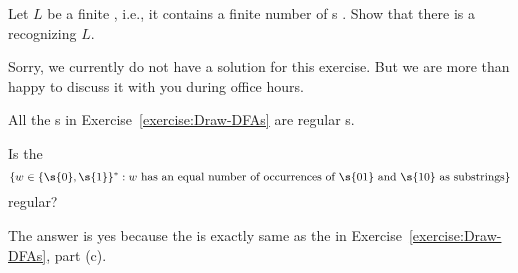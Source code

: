\begin{flex}
\begin{exercise}  \label{exercise:Finite-languages-are-regular}
Let $L$ be a finite , i.e., it contains a finite number of s . Show that there is a  recognizing $L$.
\end{exercise}


\begin{solution}
Sorry, we currently do not have a solution for this exercise. But we are more than happy to discuss it with you during office hours.
\end{solution}
\end{flex}


\begin{flex}

\begin{example} \label{example:Some-examples-of-regular-languages}
All the s in Exercise~\ref{exercise:Draw-DFAs} are regular s.
\end{example}
\end{flex}


\begin{flex}
\begin{exercise} \label{exercise:Equal-number-of-01s-and-10s}
Is the 
\[
    \{w \in \{\s{0},\s{1}\}^* : w \text{ has an equal number of occurrences of $\s{01}$ and $\s{10}$ as substrings}\}
\]
regular?
\end{exercise}


\begin{solution}
The answer is yes because the  is exactly same as the  in Exercise~\ref{exercise:Draw-DFAs}, part (c).
\end{solution}
\end{flex}





